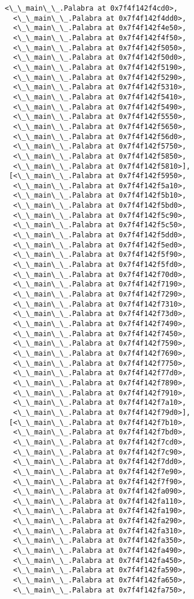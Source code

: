\documentclass[12pt,a4paper,table]{article}
\begin{document}
\begin{tcolorbox}[breakable, size=fbox, boxrule=.5pt, pad at break*=1mm, opacityfill=0]
\begin{Verbatim}[commandchars=\\\{\}]
  <\_\_main\_\_.Palabra at 0x7f4f142f4cd0>,
  <\_\_main\_\_.Palabra at 0x7f4f142f4dd0>,
  <\_\_main\_\_.Palabra at 0x7f4f142f4e50>,
  <\_\_main\_\_.Palabra at 0x7f4f142f4f50>,
  <\_\_main\_\_.Palabra at 0x7f4f142f5050>,
  <\_\_main\_\_.Palabra at 0x7f4f142f50d0>,
  <\_\_main\_\_.Palabra at 0x7f4f142f5190>,
  <\_\_main\_\_.Palabra at 0x7f4f142f5290>,
  <\_\_main\_\_.Palabra at 0x7f4f142f5310>,
  <\_\_main\_\_.Palabra at 0x7f4f142f5410>,
  <\_\_main\_\_.Palabra at 0x7f4f142f5490>,
  <\_\_main\_\_.Palabra at 0x7f4f142f5550>,
  <\_\_main\_\_.Palabra at 0x7f4f142f5650>,
  <\_\_main\_\_.Palabra at 0x7f4f142f56d0>,
  <\_\_main\_\_.Palabra at 0x7f4f142f5750>,
  <\_\_main\_\_.Palabra at 0x7f4f142f5850>,
  <\_\_main\_\_.Palabra at 0x7f4f142f5810>],
 [<\_\_main\_\_.Palabra at 0x7f4f142f5950>,
  <\_\_main\_\_.Palabra at 0x7f4f142f5a10>,
  <\_\_main\_\_.Palabra at 0x7f4f142f5b10>,
  <\_\_main\_\_.Palabra at 0x7f4f142f5bd0>,
  <\_\_main\_\_.Palabra at 0x7f4f142f5c90>,
  <\_\_main\_\_.Palabra at 0x7f4f142f5c50>,
  <\_\_main\_\_.Palabra at 0x7f4f142f5dd0>,
  <\_\_main\_\_.Palabra at 0x7f4f142f5ed0>,
  <\_\_main\_\_.Palabra at 0x7f4f142f5f90>,
  <\_\_main\_\_.Palabra at 0x7f4f142f5fd0>,
  <\_\_main\_\_.Palabra at 0x7f4f142f70d0>,
  <\_\_main\_\_.Palabra at 0x7f4f142f7190>,
  <\_\_main\_\_.Palabra at 0x7f4f142f7290>,
  <\_\_main\_\_.Palabra at 0x7f4f142f7310>,
  <\_\_main\_\_.Palabra at 0x7f4f142f73d0>,
  <\_\_main\_\_.Palabra at 0x7f4f142f7490>,
  <\_\_main\_\_.Palabra at 0x7f4f142f7450>,
  <\_\_main\_\_.Palabra at 0x7f4f142f7590>,
  <\_\_main\_\_.Palabra at 0x7f4f142f7690>,
  <\_\_main\_\_.Palabra at 0x7f4f142f7750>,
  <\_\_main\_\_.Palabra at 0x7f4f142f77d0>,
  <\_\_main\_\_.Palabra at 0x7f4f142f7890>,
  <\_\_main\_\_.Palabra at 0x7f4f142f7910>,
  <\_\_main\_\_.Palabra at 0x7f4f142f7a10>,
  <\_\_main\_\_.Palabra at 0x7f4f142f79d0>],
 [<\_\_main\_\_.Palabra at 0x7f4f142f7b10>,
  <\_\_main\_\_.Palabra at 0x7f4f142f7bd0>,
  <\_\_main\_\_.Palabra at 0x7f4f142f7cd0>,
  <\_\_main\_\_.Palabra at 0x7f4f142f7c90>,
  <\_\_main\_\_.Palabra at 0x7f4f142f7dd0>,
  <\_\_main\_\_.Palabra at 0x7f4f142f7e90>,
  <\_\_main\_\_.Palabra at 0x7f4f142f7f90>,
  <\_\_main\_\_.Palabra at 0x7f4f142fa090>,
  <\_\_main\_\_.Palabra at 0x7f4f142fa110>,
  <\_\_main\_\_.Palabra at 0x7f4f142fa190>,
  <\_\_main\_\_.Palabra at 0x7f4f142fa290>,
  <\_\_main\_\_.Palabra at 0x7f4f142fa310>,
  <\_\_main\_\_.Palabra at 0x7f4f142fa350>,
  <\_\_main\_\_.Palabra at 0x7f4f142fa490>,
  <\_\_main\_\_.Palabra at 0x7f4f142fa450>,
  <\_\_main\_\_.Palabra at 0x7f4f142fa590>,
  <\_\_main\_\_.Palabra at 0x7f4f142fa650>,
  <\_\_main\_\_.Palabra at 0x7f4f142fa750>,

\end{Verbatim}
\end{tcolorbox}
\end{document}
